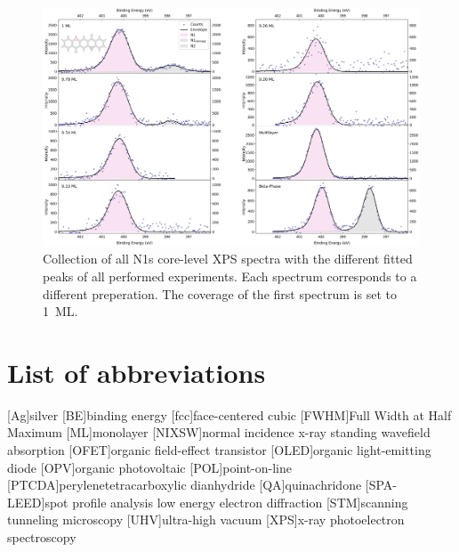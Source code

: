 \begin{figure}[H]
	\centering
	\includegraphics[height=0.9\textwidth,  angle=90]{images/N1s-all.png}
	\caption{Collection of all N1s core-level \ac{XPS} spectra with the different fitted peaks of all performed experiments. Each spectrum corresponds to a different preperation. The coverage of the first spectrum is set to 1~\ac{ML}.}
	\label{fig:N1s-stacked}
\end{figure}


\newpage
\section*{List of abbreviations}

\begin{acronym}
    [Ag]{silver}
    [BE]{binding energy}
    [fcc]{face-centered cubic}
    [FWHM]{Full Width at Half Maximum}
    [ML]{monolayer}
    [NIXSW]{normal incidence x-ray standing wavefield absorption}
    [OFET]{organic field-effect transistor}
    [OLED]{organic light-emitting diode}
    [OPV]{organic photovoltaic}
    [POL]{point-on-line}
    [PTCDA]{perylenetetracarboxylic dianhydride}
    [QA]{quinachridone}
    [SPA-LEED]{spot profile analysis low energy electron diffraction}
    [STM]{scanning tunneling microscopy}
    [UHV]{ultra-high vacuum}
    [XPS]{x-ray photoelectron spectroscopy}
\end{acronym}




